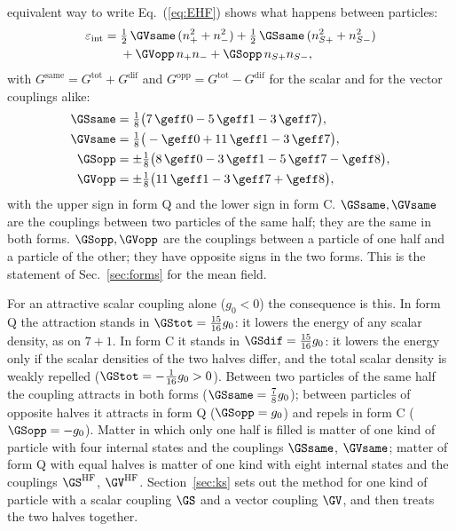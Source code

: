 equivalent way to write Eq.~(\ref{eq:EHF}) shows what happens between particles:
\begin{equation}
\begin{aligned}
\varepsilon_{\mathrm{int}}={}&\tfrac12\,\GVsame\,(n_+^{2}+n_-^{2})+\tfrac12\,\GSsame\,(n_{S+}^{2}+n_{S-}^{2})\\
&+\GVopp\,n_+n_-+\GSopp\,n_{S+}n_{S-},
\end{aligned}
\label{eq:Esame}
\end{equation}
with $G^{\mathrm{same}}=G^{\mathrm{tot}}+G^{\mathrm{dif}}$ and
$G^{\mathrm{opp}}=G^{\mathrm{tot}}-G^{\mathrm{dif}}$ for the scalar and for the vector couplings alike:
\begin{equation}
\begin{aligned}
\GSsame&=\tfrac18\big(7\,\geff0-5\,\geff1-3\,\geff7\big),\\
\GVsame&=\tfrac18\big(-\geff0+11\,\geff1-3\,\geff7\big),\\
\GSopp&=\pm\tfrac18\big(8\,\geff0-3\,\geff1-5\,\geff7-\geff8\big),\\
\GVopp&=\pm\tfrac18\big(11\,\geff1-3\,\geff7+\geff8\big),
\end{aligned}
\label{eq:Gsame}
\end{equation}
with the upper sign in form Q and the lower sign in form C. $\GSsame,\GVsame$ are the couplings
between two particles of the same half; they are the same in both forms. $\GSopp,\GVopp$ are the
couplings between a particle of one half and a particle of the other; they have opposite signs in
the two forms. This is the statement of Sec.~\ref{sec:forms} for the mean field.

For an attractive scalar coupling alone ($g_0<0$) the consequence is this. In form Q the attraction
stands in $\GStot=\tfrac{15}{16}g_0$: it lowers the energy of any scalar density, as on $7+1$. In form
C it stands in $\GSdif=\tfrac{15}{16}g_0$: it lowers the energy only if the scalar densities of the two
halves differ, and the total scalar density is weakly repelled ($\GStot=-\tfrac1{16}g_0>0$). Between
two particles of the same half the coupling attracts in both forms ($\GSsame=\tfrac78g_0$); between
particles of opposite halves it attracts in form Q ($\GSopp=g_0$) and repels in form C
($\GSopp=-g_0$). Matter in which only one half is filled is matter of one kind of particle with four
internal states and the couplings $\GSsame$, $\GVsame$; matter of form Q with equal halves is matter
of one kind with eight internal states and the couplings $\GS^{\mathrm{HF}}$, $\GV^{\mathrm{HF}}$.
Section~\ref{sec:ks} sets out the method for one kind of particle with a scalar coupling $\GS$ and a
vector coupling $\GV$, and then treats the two halves together.

